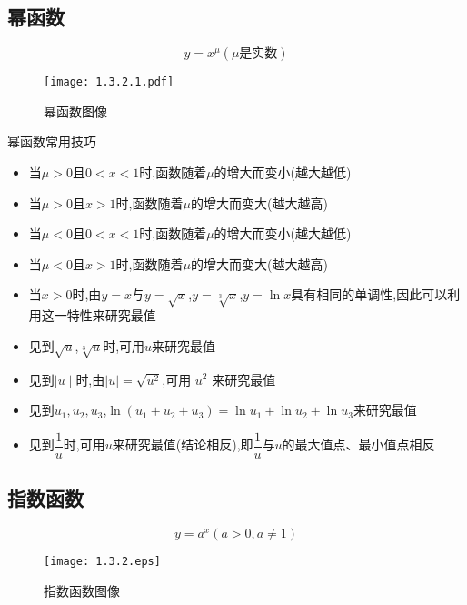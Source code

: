 \documentclass[8pt a4paper, oneside, UTF8]{ctexbook}  %
\begin{document}
\begin{sloppypar}
    \subsection{幂函数}
    $$
        y=x^{\mu}(\mu \text{是实数})
    $$
    \begin{figure}[H]
        \centering
        \texttt{[image: 1.3.2.1.pdf]}
        \caption{幂函数图像}
    \end{figure}
    \begin{criterion}{幂函数常用技巧}{}
        \begin{itemize}
            \item 当$\mu>0$且$0<x<1$时,函数随着$\mu$的增大而变小(越大越低)
            \item 当$\mu >0$且$x>1$时,函数随着$\mu$的增大而变大(越大越高)
            \item 当$\mu <0$且$0<x<1$时,函数随着$\mu$的增大而变小(越大越低)
            \item 当$\mu <0$且$x>1$时,函数随着$\mu$的增大而变大(越大越高)
            \item 当$x>0$时,由$y=x$与$y=\sqrt{x}$,$y=\sqrt[3]{x}$,$y=\ln x$具有相同的单调性,因此可以利用这一特性来研究最值
            \item 见到$\sqrt{u}$,$\sqrt[3]{u}$时,可用$u$来研究最值
            \item 见到$\mid u\mid$时,由$\mid u\mid=\sqrt{u^2}$,可用 $u^2$ 来研究最值
            \item 见到$u_1,u_2,u_3$,$\ln (u_1+u_2+u_3)=\ln u_{1}+\ln u_{2}+\ln u_{3}$来研究最值
            \item 见到$\dfrac{1}{u}$时,可用$u$来研究最值(结论相反),即$\dfrac{1}{u}$与$u$的最大值点、最小值点相反
        \end{itemize}
    \end{criterion}
    \subsection{指数函数}
    $$
        y=a^x (a>0,a \neq 1)
    $$
    \begin{figure}[H]
        \centering \texttt{[image: 1.3.2.eps]} \caption{指数函数图像}
    \end{figure}


\end{sloppypar}
\end{document}

